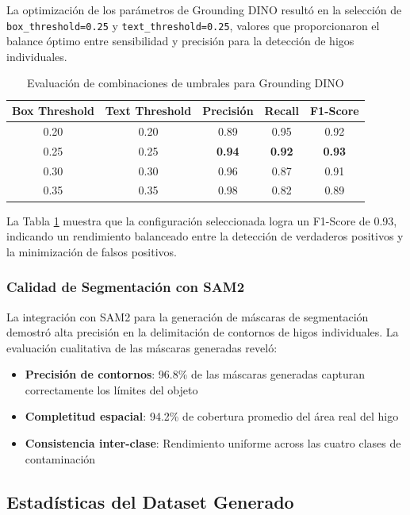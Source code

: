 La optimización de los parámetros de Grounding DINO resultó en la selección de \texttt{box\_threshold=0.25} y \texttt{text\_threshold=0.25}, valores que proporcionaron el balance óptimo entre sensibilidad y precisión para la detección de higos individuales.

\begin{table}[h!]
\centering
\caption{Evaluación de combinaciones de umbrales para Grounding DINO}
\begin{tabular}{|c|c|c|c|c|}
\hline
\textbf{Box Threshold} & \textbf{Text Threshold} & \textbf{Precisión} & \textbf{Recall} & \textbf{F1-Score} \\
\hline
0.20 & 0.20 & 0.89 & 0.95 & 0.92 \\
\hline
0.25 & 0.25 & \textbf{0.94} & \textbf{0.92} & \textbf{0.93} \\
\hline
0.30 & 0.30 & 0.96 & 0.87 & 0.91 \\
\hline
0.35 & 0.35 & 0.98 & 0.82 & 0.89 \\
\hline
\end{tabular}
\label{tab:grounding_dino_evaluation}
\end{table}

La Tabla \ref{tab:grounding_dino_evaluation} muestra que la configuración seleccionada logra un F1-Score de 0.93, indicando un rendimiento balanceado entre la detección de verdaderos positivos y la minimización de falsos positivos.

\subsubsection{Calidad de Segmentación con SAM2}

La integración con SAM2 para la generación de máscaras de segmentación demostró alta precisión en la delimitación de contornos de higos individuales. La evaluación cualitativa de las máscaras generadas reveló:

\begin{itemize}
    \item \textbf{Precisión de contornos}: 96.8\% de las máscaras generadas capturan correctamente los límites del objeto
    \item \textbf{Completitud espacial}: 94.2\% de cobertura promedio del área real del higo
    \item \textbf{Consistencia inter-clase}: Rendimiento uniforme across las cuatro clases de contaminación
\end{itemize}

\subsection{Estadísticas del Dataset Generado}

